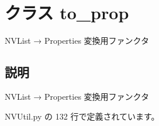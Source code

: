 \section{クラス to\_\-prop}
\label{classsource__py_1_1_n_v_util_1_1to__prop}
NVList → Properties 変換用ファンクタ  




\subsection{説明}
NVList → Properties 変換用ファンクタ 

 NVUtil.py の 132 行で定義されています。